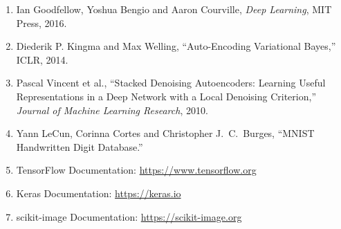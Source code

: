 \documentclass[10pt]{article}
\begin{document}
\begin{enumerate}[label=\arabic*.]
\item Ian Goodfellow, Yoshua Bengio and Aaron Courville, \textit{Deep Learning}, MIT Press, 2016.
\item Diederik P. Kingma and Max Welling, ``Auto-Encoding Variational Bayes,'' ICLR, 2014.
\item Pascal Vincent et al., ``Stacked Denoising Autoencoders: Learning Useful Representations in a Deep
Network with a Local Denoising Criterion,'' \textit{Journal of Machine Learning Research}, 2010.
\item Yann LeCun, Corinna Cortes and Christopher J.\ C.\ Burges, ``MNIST Handwritten Digit Database.''
\item TensorFlow Documentation: \url{https://www.tensorflow.org}
\item Keras Documentation: \url{https://keras.io}
\item scikit-image Documentation: \url{https://scikit-image.org}
\end{enumerate}
\end{document}
